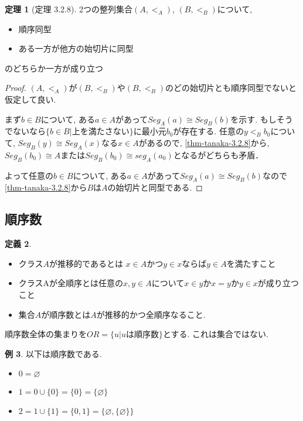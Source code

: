 \documentclass[dvipdfmx,a4paper,11pt]{article}
\theoremstyle{definition}
\newtheorem{thm}{定理}
\newtheorem{dfn}[thm]{定義}
\newtheorem{exa}[thm]{例}
\begin{document}
 \begin{tcolorbox}
 [colback = white, colframe = green!35!black, fonttitle = \bfseries,breakable = true]
\begin{thm}[定理 3.2.8]
2つの整列集合$(A,<_A)$, $(B,<_B)$について, 
\begin{itemize}
\item 順序同型
\item ある一方が他方の始切片に同型
\end{itemize}
のどちらか一方が成り立つ
\end{thm}
\end{tcolorbox}
\begin{proof}
$(A, <_A)$が$(B,<_B)$や$(B, <_B)$のどの始切片とも順序同型でないと仮定して良い.

まず$b \in B$について, ある$a \in A$があって$Seg_A(a) \cong Seg_B(b)$を示す.
 もしそうでないなら$\{ b \in B | \text{上を満たさない}\}$に最小元$b_0$が存在する. 
 任意の$y <_B b_0$について, $Seg_B(y) \cong Seg_A(x)$なる$x \in A$があるので, \ref{thm-tanaka-3.2.8}から, $Seg_{B}(b_0) \cong A$または$Seg_{B}(b_0) \cong seg_{A}(a_0)$となるがどちらも矛盾．
 
 よって任意の$b \in B$について, ある$a \in A$があって$Seg_A(a) \cong Seg_B(b)$なので\ref{thm-tanaka-3.2.8}から$B$は$A$の始切片と同型である.
\end{proof}

\subsection{順序数}

 \begin{tcolorbox}
 [colback = white, colframe = green!35!black, fonttitle = \bfseries,breakable = true]
\begin{dfn}
\begin{itemize}
\item クラス$A$が推移的であるとは
$x \in A$かつ$y \in x$ならば$y \in A$を満たすこと
\item クラスAが全順序とは任意の$x,y \in A$について$x \in y$か$x=y$か$y \in x$が成り立つこと
\item 集合$A$が順序数とは$A$が推移的かつ全順序なること. 
\end{itemize}
\end{dfn}
\end{tcolorbox}
順序数全体の集まりを$OR = \{ u | \text{$u$は順序数} \}$とする. 
これは集合ではない. 

\begin{exa}
以下は順序数である. 
\begin{itemize}
\item $0 = \varnothing$
\item $1 = 0 \cup \{ 0\} = \{ 0\} =\{ \varnothing\}$
\item $2 = 1 \cup \{1\} = \{0,1 \}= \{\varnothing, \{ \varnothing\}\}$
\end{itemize}
\end{exa}
\end{document}
